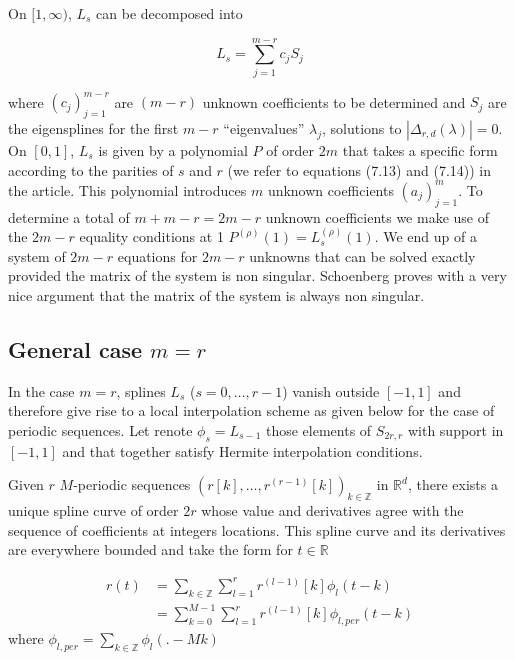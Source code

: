 \documentclass[a4paper, 11pt]{article}
\begin{document}
On $[1,\infty)$, $L_s$ can be decomposed into 

\begin{equation*}
  L_s = \sum_{j=1}^{m-r} c_j S_j
\end{equation*}

where ${(c_j)}_{j=1}^{m-r}$ are $(m-r)$ unknown coefficients to be determined and $S_j$ are the eigensplines for the 
first $m-r$ “eigenvalues” $\lambda_j$, solutions to $|\Delta_{r,d}(\lambda)|=0$. \\

On $[0,1]$, $L_s$ is given by a polynomial $P$ of order $2m$ that takes a specific form according to the parities of $s$ 
and $r$ (we refer to equations (7.13) and (7.14)) in the article. This polynomial introduces $m$ unknown coefficients 
${(a_j)}_{j=1}^{m}$. To determine a total of $m + m-r = 2m-r$ unknown coefficients we make use of the $2m-r$ equality 
conditions at 1 $P^{(\rho)}(1) = L_s^{(\rho)}(1)$. We end up of a system of $2m-r$ equations for $2m-r$ unknowns that 
can be solved exactly provided the matrix of the system is non singular. Schoenberg proves with a very nice argument 
that the matrix of the system is always non singular. \\

\subsection{General case $m=r$}\label{subsec:general_m_r}

In the case $m=r$, splines $L_s$ ($s=0, \dots, r-1$) vanish outside $[-1,1]$ and therefore give rise to a local 
interpolation scheme as given below for the case of periodic sequences. Let renote $\phi_s = L_{s-1}$ those  elements of 
$S_{2r, r}$ with support in $[-1,1]$ and that together satisfy Hermite interpolation conditions.

\begin{cor}{1}
  Given $r$ $M$-periodic sequences  ${(r[k], \dots, r^{(r-1)}[k])}_{k \in \mathbb{Z}}$ in $\mathbb{R}^d$, there exists a 
  unique spline curve of order $2r$ whose value and derivatives agree with the sequence of coefficients at integers 
  locations.  This spline curve and its derivatives are everywhere bounded and take the form for $t \in \mathbb{R}$
  
  \begin{align}
    r(t) &= \sum_{k \in \mathbb{Z}} \sum_{l=1}^r r^{(l-1)}[k] \phi_l(t-k) \\
    &= \sum_{k=0}^{M-1} \sum_{l=1}^r  r^{(l-1)}[k] \phi_{l, per}(t-k)
  \end{align}
  where $\phi_{l, per} = \sum_{k \in \mathbb{Z}} \phi_l(.-Mk)$

\end{cor}
\end{document}
